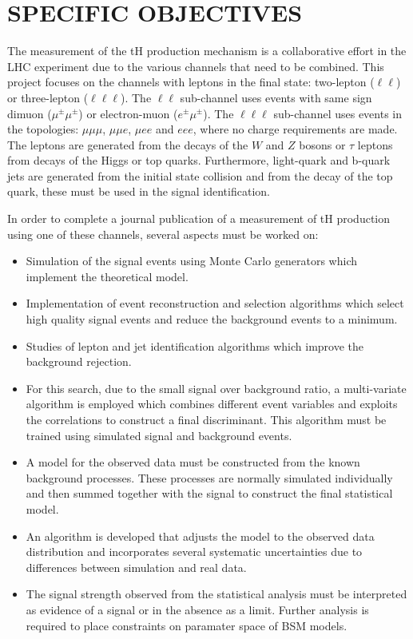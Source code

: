 \documentclass[final,3p]{CSP}
\begin{document}
\section{SPECIFIC OBJECTIVES}

\onehalfspacing The measurement of the tH production mechanism is a collaborative effort in the LHC experiment due to the various channels that need to be combined.
This project focuses on the channels with leptons in the final state: two-lepton ($\ell\ell$) or three-lepton ($\ell\ell\ell$).
The $\ell\ell$ sub-channel uses events with same sign dimuon ($\mu^\pm\mu^\pm$) or electron-muon ($e^\pm\mu^\pm$).
The $\ell\ell\ell$ sub-channel uses events in the topologies: $\mu\mu\mu$, $\mu\mu e$, $\mu e e$ and $e e e$, where no charge requirements are made.
The leptons are generated from the decays of the $W$ and $Z$ bosons or $\tau$ leptons from decays of the Higgs or top quarks.
Furthermore, light-quark and b-quark jets are generated from the initial state collision and from the decay of the top quark, these must be used in the signal identification.

In order to complete a journal publication of a  measurement of tH production using one of these channels, several aspects  must be worked on:
\begin{itemize}
\item Simulation of the signal events using Monte Carlo generators which implement the theoretical model.
\item Implementation of event reconstruction and selection algorithms which select high quality signal events and reduce the background events to a minimum.
\item Studies of lepton and jet identification algorithms which improve the background rejection.
\item For this search, due to the small signal over background ratio, a multi-variate algorithm is employed which combines different event variables and exploits the correlations to construct a final discriminant. This algorithm must be trained using simulated signal and background events.
\item A model for the observed data must be constructed from the known background processes. These processes are normally simulated individually and then summed together with the signal to construct the final statistical model.
\item An algorithm is developed that adjusts the model to the observed data distribution and incorporates several systematic uncertainties due to differences between simulation and real data.
\item The signal strength observed from the statistical analysis must be interpreted as evidence of a signal or in the absence as a limit. Further analysis is required to place constraints on paramater space of BSM models.
\end{itemize}
\end{document}
